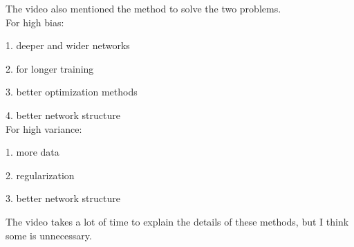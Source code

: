 \documentclass[10pt]{article}
\begin{document}
  The video also mentioned the method to solve the two problems.\\
  
  
  For high bias:
  
  
  1. deeper and wider networks



2. for longer training



3. better optimization methods



4. better network structure\\


For high variance:


1. more data



2. regularization



3. better network structure


The video takes a lot of time to explain the details of these methods, but I think some is unnecessary.
\end{document}
